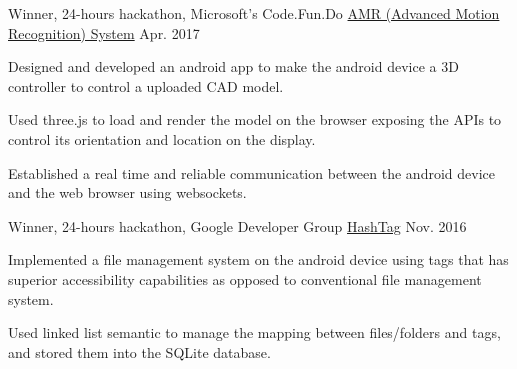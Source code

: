 \documentclass[11pt, a4paper]{cv}
\begin{document}

\begin{cventries}

  \cventry
    {Winner, 24-hours hackathon, Microsoft's Code.Fun.Do} %
        {\href{https://github.com/shivnshu/AMR-System}{AMR (Advanced Motion Recognition) System}} %
    {} %
    {Apr. 2017} %
    {
      \begin{cvitems} %
        \item {Designed and developed an android app to make the android device a 3D controller to control a uploaded CAD model.}
        \item {Used three.js to load and render the model on the browser exposing the APIs to control its orientation and location on the display.}
        \item {Established a real time and reliable communication between the android device and the web browser using websockets.}
      \end{cvitems}
    }

%
  \cventry
    {Winner, 24-hours hackathon, Google Developer Group} %
        {\href{https://github.com/shivnshu/hashtag}{HashTag}} %
    {} %
    {Nov. 2016} %
    {
      \begin{cvitems} %
        \item {Implemented a file management system on the android device using tags that has superior accessibility capabilities as opposed to conventional file management system.}
        \item {Used linked list semantic to manage the mapping between files/folders and tags, and stored them into the SQLite database.}
      \end{cvitems}
    }

\end{cventries}

\end{document}
